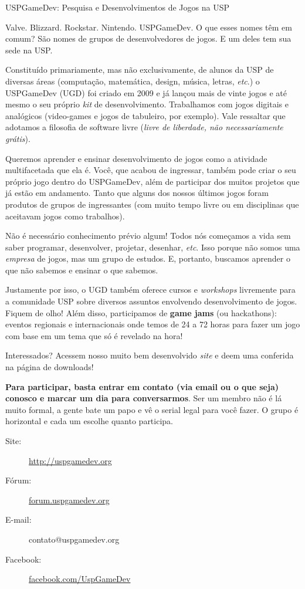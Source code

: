\begin{subsecao}{USPGameDev: Pesquisa e Desenvolvimentos de Jogos na USP}


Valve. Blizzard. Rockstar. Nintendo. USPGameDev. O que esses nomes têm em comum?
São nomes de grupos de desenvolvedores de jogos. E um deles tem sua sede na USP.

Constituído primariamente, mas não exclusivamente, de alunos da USP de diversas
áreas (computação, matemática, design, música, letras, \textit{etc}.) o
USPGameDev (UGD) foi criado em 2009 e já lançou mais de vinte jogos e até mesmo
o seu próprio \textit{kit} de desenvolvimento. Trabalhamos com jogos digitais e
analógicos (video-games e jogos de tabuleiro, por exemplo). Vale ressaltar que 
adotamos a filosofia de software livre (\textit{livre de liberdade, não 
necessariamente grátis}).

Queremos aprender e ensinar desenvolvimento de jogos como a atividade 
multifacetada que ela é. Você, que acabou de ingressar, também pode criar o seu 
próprio jogo dentro do USPGameDev, além de participar dos muitos projetos que já 
estão em andamento. Tanto que alguns dos nossos últimos jogos foram produtos de 
grupos de ingressantes (com muito tempo livre ou em disciplinas que aceitavam 
jogos como trabalhos). 

Não é necessário conhecimento prévio algum! Todos nós começamos a vida sem saber 
programar, desenvolver, projetar, desenhar, \textit{etc}. Isso porque não somos 
uma \textit{empresa} de jogos, mas um grupo de estudos. E, portanto, buscamos 
aprender o que não sabemos e ensinar o que sabemos.

Justamente por isso, o UGD também oferece cursos e \textit{workshops} livremente 
para a comunidade USP sobre diversos assuntos envolvendo desenvolvimento de 
jogos. Fiquem de olho! Além disso, participamos de \textbf{game jams} (ou 
hackathons): eventos regionais e internacionais onde temos de 24 a 72 horas para 
fazer um jogo com base em um tema que só é revelado na hora!

Interessados? Acessem nosso muito bem desenvolvido \textit{site} e deem uma 
conferida na página de downloads! 

\textbf{Para participar, basta entrar em contato (via email ou o que seja) 
conosco e marcar um dia para conversarmos}. Ser um membro não é lá muito formal, 
a gente bate um papo e vê o serial legal para você fazer. O grupo é horizontal e 
cada um escolhe quanto participa.

\begin{description}
  \item[Site:] \url{http://uspgamedev.org}
  \item[Fórum:] \url{forum.uspgamedev.org}
  \item[E-mail:] contato@uspgamedev.org
  \item[Facebook:] \url{facebook.com/UspGameDev}
\end{description}

\end{subsecao}
